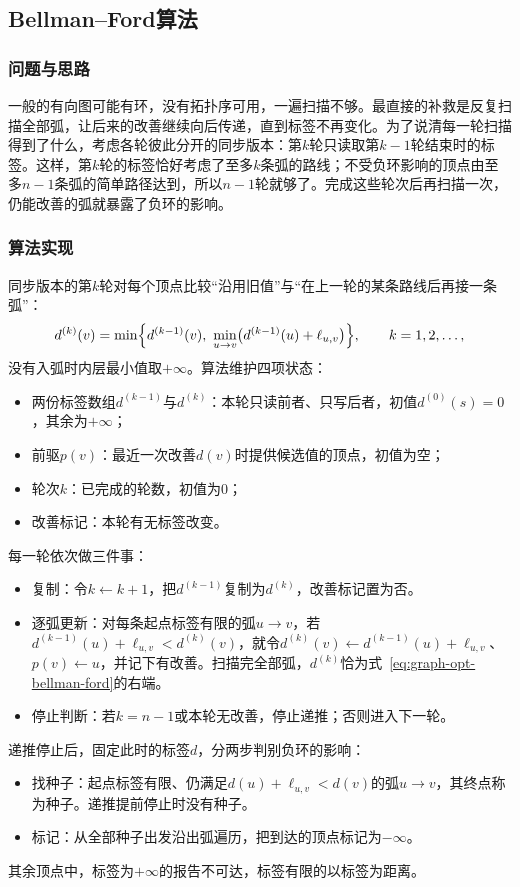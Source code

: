 \subsection{Bellman--Ford算法}
\label{sec:graph-opt-bellman-ford}

\subsubsection{问题与思路}

一般的有向图可能有环，没有拓扑序可用，一遍扫描不够。最直接的补救是反复扫描全部弧，让后来的改善继续向后传递，直到标签不再变化。为了说清每一轮扫描得到了什么，考虑各轮彼此分开的同步版本：第$k$轮只读取第$k-1$轮结束时的标签。这样，第$k$轮的标签恰好考虑了至多$k$条弧的路线；不受负环影响的顶点由至多$n-1$条弧的简单路径达到，所以$n-1$轮就够了。完成这些轮次后再扫描一次，仍能改善的弧就暴露了负环的影响。

\subsubsection{算法实现}

同步版本的第$k$轮对每个顶点比较“沿用旧值”与“在上一轮的某条路线后再接一条弧”：
\begin{equation}
  d^{(k)}(v)=\min\Bigl\{d^{(k-1)}(v),\ \min_{u\to v}\bigl(d^{(k-1)}(u)+\ell_{u,v}\bigr)\Bigr\},\qquad k=1,2,\ldots,
  \label{eq:graph-opt-bellman-ford}
\end{equation}
没有入弧时内层最小值取$+\infty$。算法维护四项状态：
\begin{itemize}
  \item 两份标签数组$d^{(k-1)}$与$d^{(k)}$：本轮只读前者、只写后者，初值$d^{(0)}(s)=0$，其余为$+\infty$；
  \item 前驱$p(v)$：最近一次改善$d(v)$时提供候选值的顶点，初值为空；
  \item 轮次$k$：已完成的轮数，初值为$0$；
  \item 改善标记：本轮有无标签改变。
\end{itemize}
每一轮依次做三件事：
\begin{itemize}
  \item 复制：令$k\gets k+1$，把$d^{(k-1)}$复制为$d^{(k)}$，改善标记置为否。
  \item 逐弧更新：对每条起点标签有限的弧$u\to v$，若$d^{(k-1)}(u)+\ell_{u,v}<d^{(k)}(v)$，就令$d^{(k)}(v)\gets d^{(k-1)}(u)+\ell_{u,v}$、$p(v)\gets u$，并记下有改善。扫描完全部弧，$d^{(k)}$恰为式~\eqref{eq:graph-opt-bellman-ford}的右端。
  \item 停止判断：若$k=n-1$或本轮无改善，停止递推；否则进入下一轮。
\end{itemize}
递推停止后，固定此时的标签$d$，分两步判别负环的影响：
\begin{itemize}
  \item 找种子：起点标签有限、仍满足$d(u)+\ell_{u,v}<d(v)$的弧$u\to v$，其终点称为种子。递推提前停止时没有种子。
  \item 标记：从全部种子出发沿出弧遍历，把到达的顶点标记为$-\infty$。
\end{itemize}
其余顶点中，标签为$+\infty$的报告不可达，标签有限的以标签为距离。

